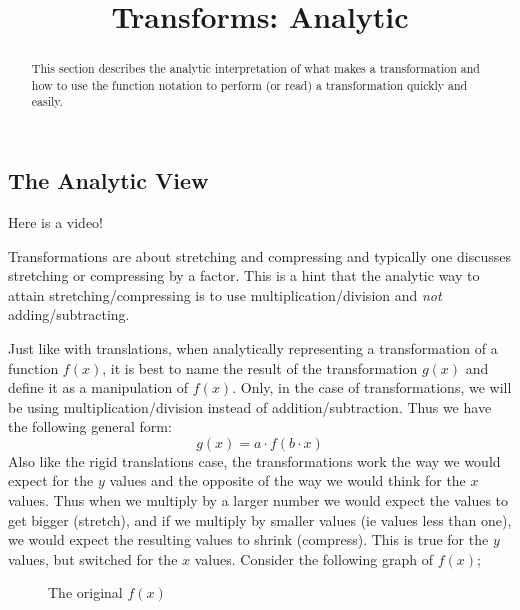 \documentclass{ximera}
\title{Transforms: Analytic}
\begin{document}
\begin{abstract}
    This section describes the analytic interpretation of what makes a transformation and how to use the function notation to perform (or read) a transformation quickly and easily.
\end{abstract}
\maketitle

\subsection*{The Analytic View}
    
    Here is a video!
    
    
    Transformations are about stretching and compressing and typically one discusses stretching or compressing by a factor. This is a hint that the analytic way to attain stretching/compressing is to use multiplication/division and \textit{not} adding/subtracting. 
    
    Just like with translations, when analytically representing a transformation of a function $f(x)$, it is best to name the result of the transformation $g(x)$ and define it as a manipulation of $f(x)$. Only, in the case of transformations, we will be using multiplication/division instead of addition/subtraction. Thus we have the following general form:
    \[
        g(x) = a \cdot f(b\cdot x)
    \]
    Also like the rigid translations case, the transformations work the way we would expect for the $y$ values and the opposite of the way we would think for the $x$ values. Thus when we multiply by a larger number we would expect the values to get bigger (stretch), and if we multiply by smaller values (ie values less than one), we would expect the resulting values to shrink (compress). This is true for the $y$ values, but switched for the $x$ values. Consider the following graph of $f(x)$;
    
    \begin{figure}[H]\centering
        \caption{The original $f(x)$}
    \end{figure}
    
\end{document}
